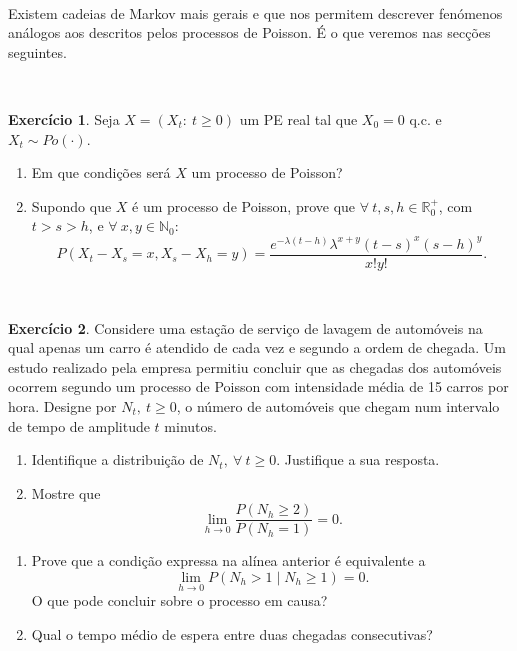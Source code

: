\documentclass[
  11pt,
  a4paper,
]{book}
\theoremstyle{definition}
\theoremstyle{definition}
\theoremstyle{definition}
\newtheorem{exercise}{Exercício}[chapter]
\theoremstyle{definition}
\theoremstyle{remark}
\begin{document}
\(\,\)

Existem cadeias de Markov mais gerais e que nos permitem descrever fenómenos análogos aos descritos pelos processos de Poisson. É o que veremos nas secções seguintes.

\(\,\)

\begin{exercise}
\leavevmode

Seja \(X=(X_t: ~t \geq 0)\) um PE real tal que \(X_0=0\) q.c. e \(X_t \sim Po(\cdot)\).

\begin{enumerate}
\def\labelenumi{(\alph{enumi})}
\item
  Em que condições será \(X\) um processo de Poisson?
\item
  Supondo que \(X\) é um processo de Poisson, prove que \(\forall ~t,s,h \in \mathbb{R}_0^+\), com \(t>s>h\), e \(\forall ~x,y \in \mathbb{N}_0\):
  \[P(X_t-X_s=x, X_s-X_h=y)=\dfrac{e^{-\lambda (t-h)} \lambda^{x+y} (t-s)^x (s-h)^y}{x!y!}.\]
\end{enumerate}

\end{exercise}

\(\,\)

\begin{exercise}
\leavevmode

Considere uma estação de serviço de lavagem de automóveis na qual apenas um carro é atendido de cada vez e segundo a ordem de chegada. Um estudo realizado pela empresa permitiu concluir que as chegadas dos automóveis ocorrem segundo um processo de Poisson com intensidade média de 15 carros por hora. Designe por \(N_t,~t \geq 0\), o número de automóveis que chegam num intervalo de tempo de amplitude \(t\) minutos.

\begin{enumerate}
\def\labelenumi{(\alph{enumi})}
\item
  Identifique a distribuição de \(N_t, ~ \forall ~t \geq 0\). Justifique a sua resposta.
\item
  Mostre que
  \[\lim\limits_{h \to 0} \dfrac{P(N_h \geq 2)}{P(N_h =1)}=0.\]
\end{enumerate}

\begin{enumerate}
\def\labelenumi{\alph{enumi})}
\setcounter{enumi}{2}
\item
  Prove que a condição expressa na alínea anterior é equivalente a
  \[\lim\limits_{h \to 0} P(N_h >1 \mid N_h \geq 1 )=0.\]
  O que pode concluir sobre o processo em causa?
\item
  Qual o tempo médio de espera entre duas chegadas consecutivas?
\end{enumerate}

\end{exercise}
\end{document}
